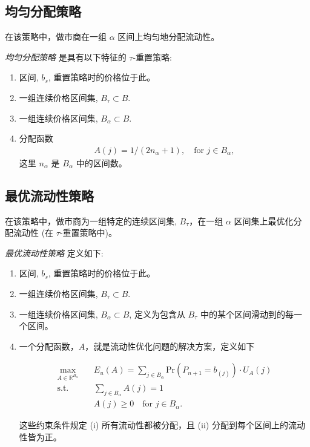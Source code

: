 \documentclass[sigconf, dvipsnames]{acmart}
\newcommand{\dcp}[1]{\textcolor{blue}{{\scriptsize{David:}}#1}}
\newcommand*{\util}{U_A}
\begin{document}
\subsection{均匀分配策略}

\quad 在该策略中，做市商在一组 $\alpha$ 区间上均匀地分配流动性。
\begin{definition}
\textit{均匀分配策略} 是具有以下特征的 $\tau$-重置策略:
\begin{enumerate}
    \item 区间, $b_s$, 重置策略时的价格位于此。
    \item 一组连续价格区间集, $B_{\tau} \subset B$.
    \item 一组连续价格区间集, $B_{\alpha} \subset B$.
    \item 分配函数
    \begin{align}\label{eq:at_allocation}
        A(j) = 1 / (2n_{\alpha}+1), \quad \text{for } j\in B_{\alpha},
    \end{align}
    这里 $n_{\alpha}$ 是 $B_{\alpha}$ 中的区间数。
\end{enumerate}
\end{definition}


\subsection{最优流动性策略}
\quad 在该策略中，做市商为一组特定的连续区间集, $B_{\tau}$，在一组 $\alpha$ 区间集上最优化分配流动性 (在 $\tau$-重置策略中)。
%
\begin{definition}
\textit{最优流动性策略} 定义如下:
\begin{enumerate}
    \item 区间, $b_s$, 重置策略时的价格位于此。
    \item 一组连续价格区间集, $B_{\tau} \subset B$.
    \item 一组连续价格区间集, $B_{\alpha} \subset B$, 定义为包含从 $B_{\tau}$ 中的某个区间滑动到的每一个区间。
    \item 一个分配函数，$A$，就是流动性优化问题的解决方案，定义如下

\begin{equation}
    \begin{aligned}
        \max_{A \in \mathbb{R}^{B_{\alpha}}} \quad& E_u(A) = \sum_{j \in B_{\alpha}} \mathrm{Pr}\left(P_{n+1} = b_{(j)}\right) \cdot \util(j)\\
        \text{s.t.} \quad& \sum_{j \in B_{\alpha}} A(j) = 1 \\
        \quad& A(j) \geq 0 \quad \text{for } j \in B_{\alpha}.
    \end{aligned}
\end{equation}

这些约束条件规定 (i) 所有流动性都被分配，且 (ii) 分配到每个区间上的流动性皆为正。
\end{enumerate}
\end{definition}
\end{document}
